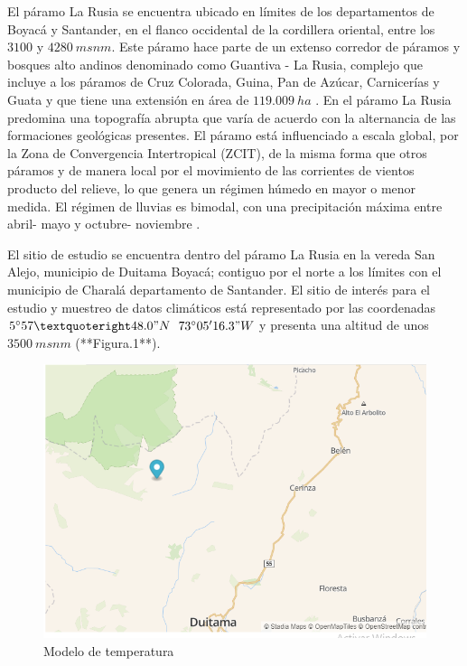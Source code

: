 \documentclass[conference,final,]{IEEEtran}
\makeatletter
\def\maxwidth{\ifdim\Gin@nat@width>\linewidth\linewidth
\else\Gin@nat@width\fi}
\let\Oldincludegraphics\includegraphics
\renewcommand{\includegraphics}[1]{\Oldincludegraphics[width=\maxwidth]{#1}}
\makeatother
\begin{document}
El páramo La Rusia se encuentra ubicado en límites de los departamentos
de Boyacá y Santander, en el flanco occidental de la cordillera
oriental, entre los \(3100\) y \(4280 \ msnm\). Este páramo hace parte
de un extenso corredor de páramos y bosques alto andinos denominado como
Guantiva - La Rusia, complejo que incluye a los páramos de Cruz
Colorada, Guina, Pan de Azúcar, Carnicerías y Guata y que tiene una
extensión en área de \(119.009 \ ha\) \citep{Cobo}. En el
páramo La Rusia predomina una topografía abrupta que varía de acuerdo
con la alternancia de las formaciones geológicas presentes. El páramo
está influenciado a escala global, por la Zona de Convergencia
Intertropical (ZCIT), de la misma forma que otros páramos y de manera
local por el movimiento de las corrientes de vientos producto del
relieve, lo que genera un régimen húmedo en mayor o menor medida. El
régimen de lluvias es bimodal, con una precipitación máxima entre abril-
mayo y octubre- noviembre \citep{Uptc}.

El sitio de estudio se encuentra dentro del páramo La Rusia en la vereda
San Alejo, municipio de Duitama Boyacá; contiguo por el norte a los
límites con el municipio de Charalá departamento de Santander. El sitio
de interés para el estudio y muestreo de datos climáticos está
representado por las coordenadas \(5^{\circ}57’48.0"N\)
\(73^{\circ}05'16.3"W\) y presenta una altitud de unos \(3500\ msnm\) (**Figura.1**).

\begin{figure}
\centering
\includegraphics{mapaloc.png}
\caption{Modelo de temperatura}
\end{figure}
\end{document}
